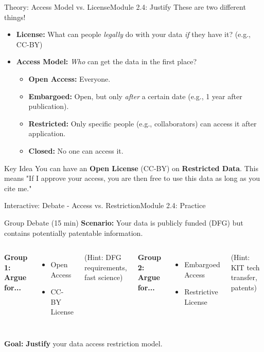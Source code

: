 \begin{frame}{Theory: Access Model vs. License}{Module 2.4: Justify}
    These are two different things!
    
    \begin{itemize}
        \item \textbf{License:} What can people \emph{legally} do with your data \textit{if} they have it? (e.g., CC-BY)
        \pause
        \item \textbf{Access Model:} \textit{Who} can get the data in the first place?
        \begin{itemize}
            \item \textbf{Open Access:} Everyone.
            \item \textbf{Embargoed:} Open, but only \textit{after} a certain date (e.g., 1 year after publication).
            \item \textbf{Restricted:} Only specific people (e.g., collaborators) can access it after application.
            \item \textbf{Closed:} No one can access it.
        \end{itemize}
    \end{itemize}
    \pause
    \begin{block}{Key Idea}
        You can have an \textbf{Open License} (CC-BY) on \textbf{Restricted Data}. This means "If I approve your access, you are then free to use this data as long as you cite me."
    \end{block}
\end{frame}

\begin{frame}{Interactive: Debate - Access vs. Restriction}{Module 2.4: Practice}
    \begin{block}{Group Debate (15 min)}
        \textbf{Scenario:} Your data is publicly funded (DFG) but contains potentially patentable information.
        \pause
        \begin{columns}
            \textbf{Group 1: Argue for...}
            \begin{itemize}
                \item Open Access
                \item CC-BY License
            \end{itemize}
            (Hint: DFG requirements, fast science)
            
            \textbf{Group 2: Argue for...}
            \begin{itemize}
                \item Embargoed Access
                \item Restrictive License
            \end{itemize}
            (Hint: KIT tech transfer, patents)
        \end{columns}
        \pause
        \textbf{Goal:} \textbf{Justify} your data access restriction model.
    \end{block}
\end{frame}

